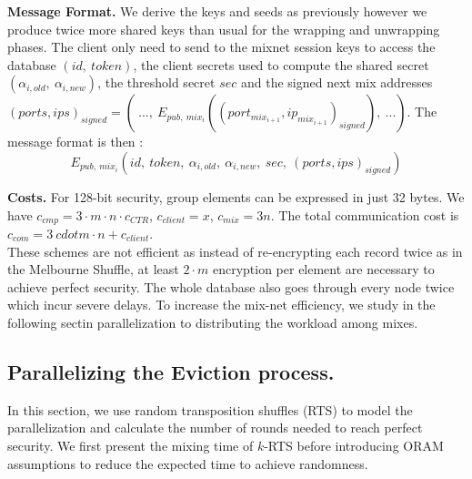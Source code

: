 \documentclass{llncs}
\begin{document}
\noindent\textbf{Message Format.}
We derive the keys and seeds as previously however we produce twice more shared keys than usual for the wrapping and unwrapping phases. \iffalse\\
Let $\kappa$ be the security parameter. We call $\mathcal{G}$ a prime order cyclic group satisfying the Decisional Diffie-Hellman Assumption. $\mathcal{G}^*$ is the set of non-identity elements of $\mathcal{G}$. The element $g$ is a generator of the group, and $q$ is the prime order of $\mathcal{G}$ with $q \approx 2^{2\kappa}$.\\
We suppose each mix owns a pair of keys ($\ priv_i \in \mathbb{Z}_{q}^*$, $pub_i=g^{priv_i}\in \mathcal{G}^*$). We assume the existence of a PKI that publishes a list of all ($mix_i$,\ $pub_i$) pair.
The client randomly chooses $x\in_\mathcal{R} \mathbb{Z}_q^*$ and sends to the mix $mix_i$ the element $\alpha_i=g^{x\cdot b_i}$ with $b_i$ a binding factors, the shared secret is then $s_i=pub_i^{x\cdot b_i}$.
\fi
The client only need to send to the mixnet session keys to access the database $(id,\ token)$, the client secrets used to compute the shared secret $( \alpha_{i,old},\ \alpha_{i,new} )$, the threshold secret $sec$ and the signed next mix addresses $(ports,ips)_{signed}= \left (\ ...,\ E_{pub,\ mix_{i}}\left ((port_{mix_{i+1}}, ip_{mix_{i+1}})_{signed}\right),\ ...\right)$.
The message format is then : $$E_{pub,\ mix_i}\left(id,\ token,\ \alpha_{i,old},\ \alpha_{i,new},\ sec,\ (ports,ips)_{signed} \right)$$ 


\noindent\textbf{Costs.} For 128-bit security, group elements can be expressed in just 32 bytes. We have $c_{cmp} = 3 \cdot m \cdot n \cdot c_{CTR} $, $c_{client}=  x$, $c_{mix}=3n$. The total communication cost is $c_{com}=3 \ cdot m \cdot n + c_{client}$.\\


These schemes are not efficient as instead of re-encrypting each record twice as in the Melbourne Shuffle, at least $2\cdot m$ encryption per element are necessary to achieve perfect security. The whole database also goes through every node twice which incur severe delays. To increase the mix-net efficiency, we study in the following sectin parallelization to distributing the workload among mixes.
%
\subsection{Parallelizing the Eviction process.}\label{Parallel}
In this section, we use random transposition shuffles (RTS) to model the parallelization  and calculate the number of rounds needed to reach perfect security.
We first present the mixing time of $k$-RTS before introducing ORAM assumptions to reduce the expected time to achieve randomness.
%
\end{document}
